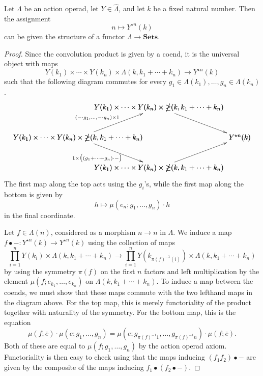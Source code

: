 \documentclass{amsbook} %
\newcommand{\mb}{\mathbf}
\numberwithin{section}{chapter}
\begin{document}
\begin{lem}\label{calclem2}
Let $\Lambda$ be an action operad, let $Y \in \hat{\mathbb{\Lambda}}$, and let $k$ be a fixed natural number.  Then the assignment
\[
n \mapsto Y^{\star n}(k)
\]
can be given the structure of a functor $\mathbb{\Lambda} \rightarrow \mb{Sets}$.
\end{lem}
\begin{proof}
Since the convolution product is given by a coend, it is the universal object with maps
\[
Y(k_{1}) \times \cdots \times Y(k_{n}) \times \mathbb{\Lambda}(k, k_{1} + \cdots + k_{n}) \rightarrow Y^{\star n}(k)
\]
such that the following diagram commutes for every $g_{1} \in \Lambda(k_{1}), \ldots, g_{n} \in \Lambda(k_{n})$.
\[
\xy
{\ar   (0,0)*+{Y(k_{1}) \times \cdots \times Y(k_{n}) \times \mathbb{\Lambda}(k, k_{1} + \cdots + k_{n})}; (40,15)*+{Y(k_{1}) \times \cdots \times Y(k_{n}) \times \mathbb{\Lambda}(k, k_{1} + \cdots + k_{n})} };
(9.5,10)*{\scriptstyle (-\cdot g_{1}, \ldots, -\cdot g_{n}) \times 1};
{\ar (40,15)*+{Y(k_{1}) \times \cdots \times Y(k_{n}) \times \mathbb{\Lambda}(k, k_{1} + \cdots + k_{n})}; (80,0)*+{Y^{\star n}(k)} };
{\ar (0,0)*+{Y(k_{1}) \times \cdots \times Y(k_{n}) \times \mathbb{\Lambda}(k, k_{1} + \cdots + k_{n})}; (40,-15)*+{Y(k_{1}) \times \cdots \times Y(k_{n}) \times \mathbb{\Lambda}(k, k_{1} + \cdots + k_{n})} };
(9.5,-10)*+{\scriptstyle 1 \times \big( (g_{1} + \cdots + g_{n})\cdot - \big)};
{\ar (40,-15)*+{Y(k_{1}) \times \cdots \times Y(k_{n}) \times \mathbb{\Lambda}(k, k_{1} + \cdots + k_{n})}; (80,0)*+{Y^{\star n}(k)} };
\endxy
\]
The first map along the top acts using the $g_{i}$'s, while the first map along the bottom is given by
\[
h \mapsto \mu(e_{n}; g_{1}, \ldots, g_{n}) \cdot h
\]
in the final coordinate.

Let $f \in \Lambda(n)$, considered as a morphism $n \rightarrow n$ in $\mathbb{\Lambda}$.  We induce a map $f \bullet -:Y^{\star n}(k) \rightarrow Y^{\star n}(k)$ using the collection of maps
\[
\prod_{i=1}^{n} Y(k_{i}) \times \mathbb{\Lambda}(k, k_{1} + \cdots + k_{n}) \rightarrow \prod_{i=1}^{n} Y(k_{\pi (f)^{-1}(i)}) \times \mathbb{\Lambda}(k, k_{1} + \cdots + k_{n})
\]
by using the symmetry $\pi(f)$ on the first $n$ factors and left multiplication by the element $\mu(f; e_{k_{1}}, \ldots, e_{k_{n}})$ on $\mathbb{\Lambda}(k, k_{1} + \cdots + k_{n})$.  To induce a map between the coends, we must show that these maps commute with the two lefthand maps in the diagram above.  For the top map, this is merely functoriality of the product together with naturality of the symmetry.  For the bottom map, this is the equation
\[
\mu(f; \overline{e}) \cdot \mu(e; g_{1}, \ldots, g_{n}) = \mu(e; g_{\pi (f)^{-1} 1}, \ldots, g_{\pi (f)^{-1} n}) \cdot \mu(f; \overline{e}).
\]
Both of these are equal to $\mu(f; g_{1}, \ldots, g_{n})$ by the action operad axiom.  Functoriality is then easy to check using that the maps inducing $(f_{1}f_{2}) \bullet -$ are given by the composite of the maps inducing $f_{1} \bullet (f_{2} \bullet -)$.
\end{proof}
\end{document}
